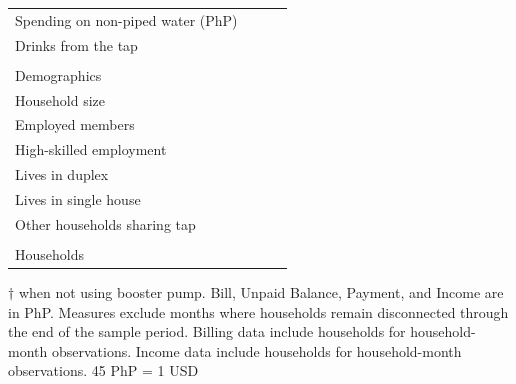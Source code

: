 \documentclass[12pt,table]{article}
\begin{document}
\begin{table}[h!]
\begin{threeparttable}
\begin{tabular}{@{}l*{1}{KKK}@{}}
\hspace{1em}Spending on non-piped water (PhP) &  \\
\hspace{1em}Drinks from the tap &  \\
\\[-.5em]
Demographics \\[.5em]
\hspace{1em}Household size &  \\
\hspace{1em}Employed members &  \\
\hspace{1em}High-skilled employment &  \\
\hspace{1em}Lives in duplex&  \\
\hspace{1em}Lives in single house&  \\
\hspace{1em}Other households sharing tap&  \\
\\[-.5em]
Households &  \\
\bottomrule
\end{tabular}
\begin{tablenotes}
\footnotesize
\item  $\dagger$ when not using booster pump.  Bill, Unpaid Balance, Payment, and Income are in PhP.  Measures exclude months where households remain disconnected through the end of the sample period.  Billing data include households for household-month observations.  Income data include households for household-month observations.  45 PhP = 1 USD \,\,
\end{tablenotes}
\end{threeparttable}
\end{table}
\end{document}
